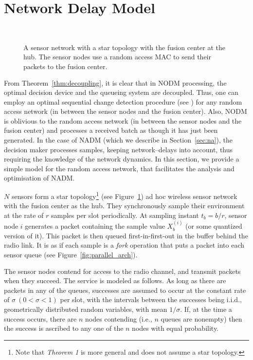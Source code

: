 \documentclass[acmtosn]{acmtrans2m}
\begin{document}
\section{Network Delay Model}
\label{sec:net_delay_model}
\begin{figure}[t]
   \centering \
   \caption{A sensor network with a star topology with the fusion
     center at the hub. The sensor nodes use a random access MAC to
     send their packets to the fusion center.}
   \label{fig:wsn_star}
 \end{figure}
From Theorem~\ref{thm:decoupling}, it is clear that in {\sf NODM} 
processing, the optimal decision device and the queueing system are 
decoupled. Thus, one can employ an optimal sequential change 
detection procedure (see \cite{shiryayev}) for any random
access network (in between the sensor nodes and the fusion center). 
Also, {\sf NODM} is oblivious to the random access network
(in between the sensor nodes and the fusion center) and processes
a received batch as though it has just been generated.  
In the case of {\sf NADM} (which we describe in Section~\ref{sec:na}), 
the decision maker processes samples, keeping network--delays
into account, thus requiring the knowledge of the network dynamics. 
In this section, we provide a simple model
for the random access network, that facilitates the analysis and 
optimisation of {\sf NADM}. 

$N$ sensors form a star topology\footnote{Note that {\em Theorem 1} 
is more general and does not assume a star topology.} (see 
Figure~\ref{fig:wsn_star}) ad hoc wireless sensor network with the
fusion center as the hub. They synchronously sample their environment
at the rate of $r$ samples per slot periodically. At sampling instant
$t_b = b/r$, sensor node $i$ generates a packet containing the sample value
$X^{(i)}_b$ (or some quantized version of it). This packet is then
queued first-in-first-out in the buffer behind the radio link. It is
as if each sample is a \emph{fork} operation that puts a packet into
each sensor queue (see Figure~\ref{fig:parallel_arch}).


The sensor nodes contend for access to the radio channel, and transmit
packets when they succeed. The service is modeled as follows. As long
as there are packets in any of the queues, successes are assumed to
occur at the constant rate of $\sigma~(0<\sigma<1)$ per slot, with the intervals
between the successes being i.i.d., geometrically distributed random
variables, with mean $1/\sigma$. If, at the time a success occurs, there
are $n$ nodes contending (i.e., $n$ queues are nonempty) then the
success is ascribed to any one of the $n$ nodes with equal
probability. 
\end{document}
